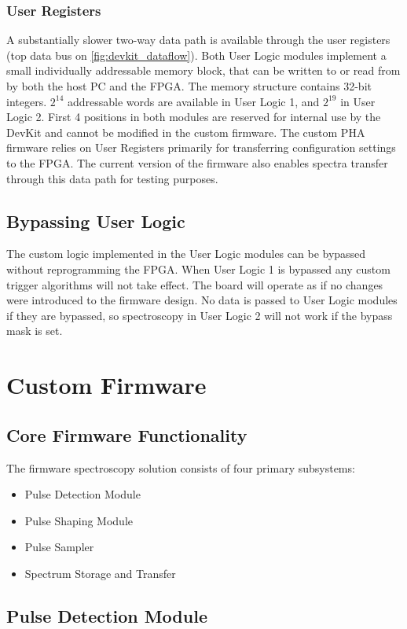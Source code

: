\documentclass[12pt]{article}
\begin{document}
		\subsubsection{User Registers}
		A substantially slower two-way data path is available through the user registers (top data bus on \autoref{fig:devkit_dataflow}). Both User Logic modules
		implement a small individually addressable memory block, that can be written to or read from by both 
		the host PC and the FPGA. The memory structure contains 32-bit integers. $2^{14}$ addressable words
		are available in User Logic 1, and $2^{19}$ in User Logic 2. First 4 positions in both modules are reserved 
		for internal use by the DevKit and cannot be modified in the custom firmware. The custom PHA firmware
		relies on User Registers primarily for transferring configuration settings to the FPGA.
		The current version of the firmware also enables spectra transfer through this data path for testing purposes.
	\subsection{Bypassing User Logic}
		The custom logic implemented in the User Logic modules can be bypassed without reprogramming the 
		FPGA. When User Logic 1 is bypassed any custom trigger algorithms will not take effect. 
		The board will operate as if no changes were introduced to the firmware design. 
		No data is passed to User Logic modules if they are bypassed, so spectroscopy in 
		User Logic 2 will not work if the bypass mask is set.
\section{Custom Firmware}
\subsection{Core Firmware Functionality}
The firmware spectroscopy solution consists of four primary subsystems:
\begin{itemize}
	\item Pulse Detection Module
	\item Pulse Shaping Module
	\item Pulse Sampler
	\item Spectrum Storage and Transfer
\end{itemize}
\subsection{Pulse Detection Module}
\end{document}
